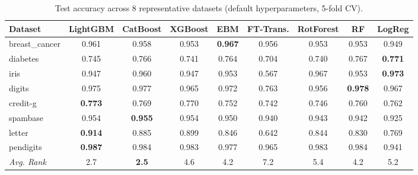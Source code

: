 \begin{table}[t]
\centering
\caption{Test accuracy across 8 representative datasets (default hyperparameters, 5-fold CV).}
\label{tab:benchmark}
\small
\setlength{\tabcolsep}{4pt}
\begin{tabular}{@{}lcccccccc@{}}
\toprule
\textbf{Dataset} & \textbf{LightGBM} & \textbf{CatBoost} & \textbf{XGBoost} & \textbf{EBM} & \textbf{FT-Trans.} & \textbf{RotForest} & \textbf{RF} & \textbf{LogReg} \\
\midrule
breast_cancer & 0.961 & 0.958 & 0.953 & \textbf{0.967} & 0.956 & 0.953 & 0.953 & 0.949 \\
diabetes & 0.745 & 0.766 & 0.741 & 0.764 & 0.704 & 0.740 & 0.767 & \textbf{0.771} \\
iris & 0.947 & 0.960 & 0.947 & 0.953 & 0.567 & 0.967 & 0.953 & \textbf{0.973} \\
digits & 0.975 & 0.977 & 0.965 & 0.972 & 0.763 & 0.956 & \textbf{0.978} & 0.967 \\
credit-g & \textbf{0.773} & 0.769 & 0.770 & 0.752 & 0.742 & 0.746 & 0.760 & 0.762 \\
spambase & 0.954 & \textbf{0.955} & 0.954 & 0.950 & 0.940 & 0.943 & 0.942 & 0.925 \\
letter & \textbf{0.914} & 0.885 & 0.899 & 0.846 & 0.642 & 0.844 & 0.830 & 0.769 \\
pendigits & \textbf{0.987} & 0.984 & 0.983 & 0.977 & 0.965 & 0.983 & 0.984 & 0.941 \\
\midrule
\textit{Avg. Rank} & 2.7 & \textbf{2.5} & 4.6 & 4.2 & 7.2 & 5.4 & 4.2 & 5.2 \\
\bottomrule
\end{tabular}
\end{table}